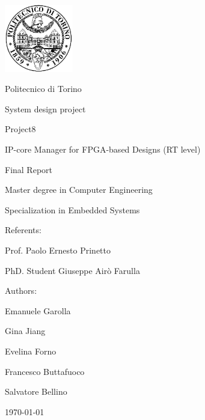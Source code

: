 \documentclass[12pt,  english, makeidx, a4paper, titlepage, oneside]{book}
\begin{document}
\frontmatter
\begin{titlepage}
\vspace{0cm}
\centerline{
\includegraphics[width=3cm]{./logopoli}} 
\vspace{0.5cm}
\centerline{\LARGE Politecnico di Torino}
\vspace{2cm}
\centerline{\Huge\sf System design project}
\vspace{1cm}
\centerline{\huge \sf Project8 }
\bigskip
\centerline{\huge\sf IP-core Manager for FPGA-based Designs (RT level)}
\bigskip
\centerline{\huge\sf Final Report}
\vspace{1.5cm}
\centerline{\Large Master degree in Computer Engineering}
\centerline{\Large Specialization in Embedded Systems}
\bigskip
\vspace{0.5cm}
%
\centerline{\large Referents: }
\centerline{\large Prof. Paolo Ernesto Prinetto}
\centerline{\large PhD. Student Giuseppe Air\`{o} Farulla}
\bigskip
\vspace{0.5cm}
%
%
\centerline{\large Authors:}
\bigskip
%
%
\centerline{\large Emanuele Garolla}
\centerline{\large Gina Jiang}
\centerline{\large Evelina Forno}
\centerline{\large Francesco Buttafuoco}
\centerline{\large Salvatore Bellino}

%
\vspace{1.5cm}
\centerline{\large \monthyeardate\today}
\end{titlepage}
 
\newenvironment{acknowledgements}%
{\cleardoublepage\thispagestyle{empty}\null\vfill\begin{center}%
		\bfseries\textbf{ \huge Acknowledgements}\end{center}}%
{\vfill\null}



\tableofcontents

\mainmatter
%    
%

%

% 
%
%    
%
%
% 
%
\end{document}
